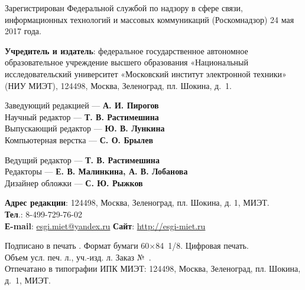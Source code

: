 \begin{flushleft}
\small
Зарегистрирован Федеральной службой по надзору в сфере связи, информационных технологий
и массовых коммуникаций (Роскомнадзор) 24 мая 2017 года.


\textbf{Учредитель и издатель}: федеральное государственное автономное образовательное учреждение
высшего образования «Национальный исследовательский университет «Московский институт
электронной техники» (НИУ МИЭТ), 124498, Москва, Зеленоград, пл. Шокина, д. 1.
\end{flushleft}

\noindent
\begin{minipage}[t]{.48\textwidth}
    
    \begin{flushleft}
        \footnotesize
        Заведующий редакцией — \textbf{А. И. Пирогов}\\
        Научный редактор — \textbf{Т. В. Растимешина}\\
        Выпускающий редактор — \textbf{Ю. В. Лункина}\\
        Компьютерная верстка — \textbf{С. О. Брылев}
    \end{flushleft}
\end{minipage}\hspace{0.04\textwidth}
\begin{minipage}[t]{.48\textwidth}
    \begin{flushleft}
        \footnotesize
Ведущий редактор — \textbf{Т. В. Растимешина}\\
Редакторы — \textbf{Е. В. Малинкина, А. В. Лобанова}\\
Дизайнер обложки — \textbf{С. Ю. Рыжков}
    \end{flushleft}
\end{minipage}

\begin{flushleft}
    \small
    \textbf{Адрес редакции}: 124498, Москва, Зеленоград, пл. Шокина, д. 1, МИЭТ.\\
    \textbf{Тел}.: 8-499-729-76-02\\
    \textbf{Е-mail}: \href{mailto:esgi.miet@yandex.ru}{esgi.miet@yandex.ru} \hspace{3em}
    \textbf{Сайт}: \url{http://esgi-miet.ru}

     \vspace{1em}
    Подписано в печать \esgiPDate. Формат бумаги 60\(×\)84 1/8. Цифровая печать.\\
    Объем \esgiUPL{} усл. печ. л., \esgiUIL{} уч.-изд. л. Заказ № \esgiPRN{}.\\
    Отпечатано в типографии ИПК МИЭТ: 124498, Москва, Зеленоград, пл. Шокина, д. 1, МИЭТ.
\end{flushleft}

\normalsize
\setmainlinespread
\newpage